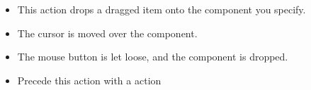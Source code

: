
\begin{itemize}
\item This action drops a dragged item onto the component you specify.
\item The cursor is moved over the component.
\item The mouse button is let loose, and the component is dropped. 
\item Precede this action with a  action
\end{itemize}

